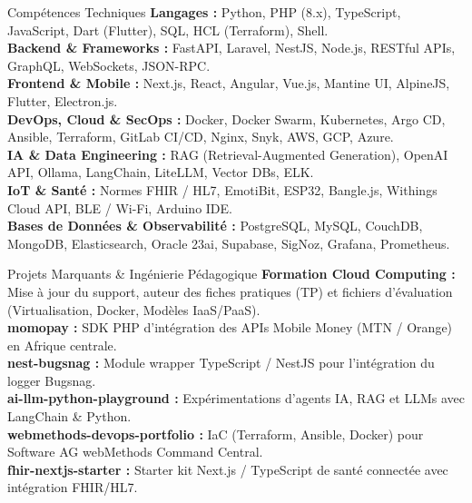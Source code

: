 \documentclass{resume}
\begin{document}
\begin{rSection}{Compétences Techniques}
{\bf Langages :} Python, PHP (8.x), TypeScript, JavaScript, Dart (Flutter), SQL, HCL (Terraform), Shell. \\
{\bf Backend \& Frameworks :} FastAPI, Laravel, NestJS, Node.js, RESTful APIs, GraphQL, WebSockets, JSON-RPC. \\
{\bf Frontend \& Mobile :} Next.js, React, Angular, Vue.js, Mantine UI, AlpineJS, Flutter, Electron.js. \\
{\bf DevOps, Cloud \& SecOps :} Docker, Docker Swarm, Kubernetes, Argo CD, Ansible, Terraform, GitLab CI/CD, Nginx, Snyk, AWS, GCP, Azure. \\
{\bf IA \& Data Engineering :} RAG (Retrieval-Augmented Generation), OpenAI API, Ollama, LangChain, LiteLLM, Vector DBs, ELK. \\
{\bf IoT \& Santé :} Normes FHIR / HL7, EmotiBit, ESP32, Bangle.js, Withings Cloud API, BLE / Wi-Fi, Arduino IDE. \\
{\bf Bases de Données \& Observabilité :} PostgreSQL, MySQL, CouchDB, MongoDB, Elasticsearch, Oracle 23ai, Supabase, SigNoz, Grafana, Prometheus.
\end{rSection}

\begin{rSection}{Projets Marquants \& Ingénierie Pédagogique}
{\bf Formation Cloud Computing :} Mise à jour du support, auteur des fiches pratiques (TP) et fichiers d'évaluation (Virtualisation, Docker, Modèles IaaS/PaaS). \\
{\bf momopay :} SDK PHP d'intégration des APIs Mobile Money (MTN / Orange) en Afrique centrale. \\
{\bf nest-bugsnag :} Module wrapper TypeScript / NestJS pour l'intégration du logger Bugsnag. \\
{\bf ai-llm-python-playground :} Expérimentations d'agents IA, RAG et LLMs avec LangChain \& Python. \\
{\bf webmethods-devops-portfolio :} IaC (Terraform, Ansible, Docker) pour Software AG webMethods Command Central. \\
{\bf fhir-nextjs-starter :} Starter kit Next.js / TypeScript de santé connectée avec intégration FHIR/HL7.
\end{rSection}
\end{document}

